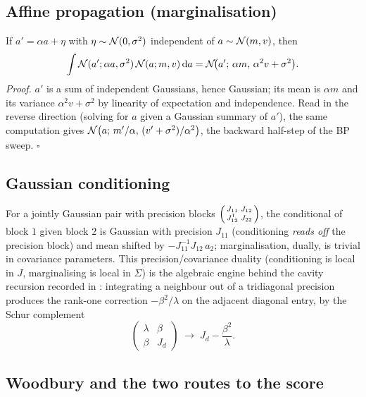 \subsection{Affine propagation (marginalisation)}

If $a' = \alpha a + \eta$ with $\eta \sim \mathcal{N}(0, \sigma^2)$ independent of
$a \sim \mathcal{N}(m, v)$, then
\begin{equation}
  \int \mathcal{N}(a'; \alpha a, \sigma^2)\, \mathcal{N}(a; m, v)\, \mathrm{d} a
  = \mathcal{N}\!\big(a';\, \alpha m,\, \alpha^2 v + \sigma^2\big).
  \label{eq:gauss-predict}
\end{equation}
\emph{Proof.} $a'$ is a sum of independent Gaussians, hence Gaussian; its
mean is $\alpha m$ and its variance $\alpha^2 v + \sigma^2$ by linearity
of expectation and independence. Read in the reverse direction (solving
for $a$ given a Gaussian summary of $a'$), the same computation gives
$\mathcal{N}\big(a;\, m'/\alpha,\, (v' + \sigma^2)/\alpha^2\big)$, the backward
half-step of the BP sweep. $\square$

\subsection{Gaussian conditioning}

For a jointly Gaussian pair with precision blocks
$\begin{psmallmatrix} J_{11} & J_{12} \\ J_{12}^{\mathsf{T}} & J_{22}
\end{psmallmatrix}$, the conditional of block $1$ given block $2$ is
Gaussian with precision $J_{11}$ (conditioning \emph{reads off} the
precision block) and mean shifted by $-J_{11}^{-1} J_{12}\, a_2$;
marginalisation, dually, is trivial in covariance parameters. This
precision/covariance duality (conditioning is local in $J$,
marginalising is local in $\Sigma$) is the algebraic engine behind the
cavity recursion recorded in \compendium{}: integrating a neighbour out of a
tridiagonal precision produces the rank-one correction
$-\beta^2/\lambda$ on the adjacent diagonal entry, by the Schur
complement
\begin{equation}
  \begin{pmatrix} \lambda & \beta \\ \beta & J_d \end{pmatrix}
  \;\longrightarrow\;
  J_d - \frac{\beta^2}{\lambda}.
  \label{eq:gauss-schur}
\end{equation}

\subsection{Woodbury and the two routes to the score}

